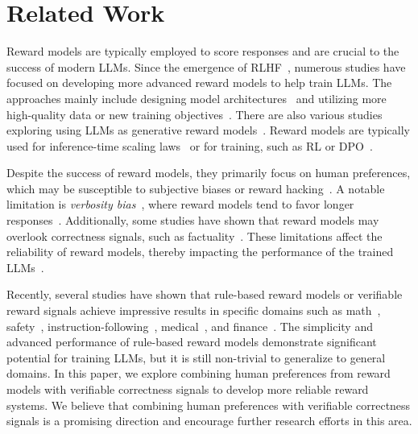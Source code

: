 \section{Related Work}
Reward models are typically employed to score responses and are crucial to the success of modern LLMs. Since the emergence of RLHF~\citep{ouyang2022training}, numerous studies have focused on developing more advanced reward models to help train LLMs. The approaches mainly include designing model architectures~\citep{wang2024interpretable,dorka2024quantile,chen2025LDLRewardGemma} and utilizing more high-quality data or new training objectives~\citep{infly2024inf,yuan2024advancing,park2024offsetbias,liu2024skywork,cai2024internlm2,cao2024compass,lou2024uncertainty,litool2024,wang2024helpsteer2}. There are also various studies exploring using LLMs as generative reward models~\citep{zheng2023judging,mahan2024generative,skyworkcritic2024,cao2024compass,tan2024judgebench,yu2024self,alexandru2025atlaseleneminigeneral}.
Reward models are typically used for inference-time scaling laws~\citep{irvine2023rewarding,wu2024inference,snell2024scaling,brown2024large,xin2024deepseek} or for training, such as RL\citep{ouyang2022training} or DPO~\citep{rafailov2024direct}.

Despite the success of reward models, they primarily focus on human preferences, which may be susceptible to subjective biases or reward hacking~\citep{saito2023verbosity,singhal2023long,gao2023scaling,zhang2024lists,chen2024odin}. A notable limitation is \textit{verbosity bias}~\citep{saito2023verbosity}, where reward models tend to favor longer responses~\citep{singhal2023long, liu2024rm}. Additionally, some studies have shown that reward models may overlook correctness signals, such as factuality~\citep{lin2024flame, liu2024rm, tan2024judgebench}. These limitations affect the reliability of reward models, thereby impacting the performance of the trained LLMs~\citep{singhal2023long}.


Recently, several studies have shown that rule-based reward models or verifiable reward signals achieve impressive results in specific domains such as math~\citep{guo2025deepseek}, safety~\citep{mu2024rule}, instruction-following~\citep{lambert2024t}, medical~\citep{chen2024huatuogpt}, and finance~\citep{qian2025fino1}. The simplicity and advanced performance of rule-based reward models demonstrate significant potential for training LLMs, but it is still non-trivial to generalize to general domains.
In this paper, we explore combining human preferences from reward models with verifiable correctness signals to develop more reliable reward systems.
We believe that combining human preferences with verifiable correctness signals is a promising direction and encourage further research efforts in this area.
